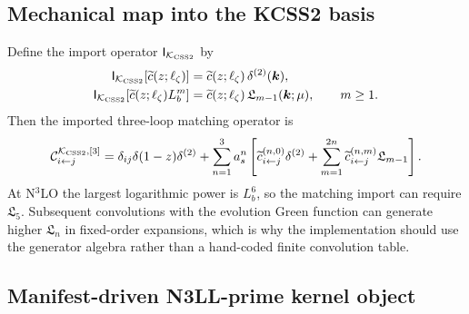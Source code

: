 \documentclass[11pt]{article}
\newcommand{\bk}{\bm{k}}
\newcommand{\deltaT}{\delta^{(2)}}
\newcommand{\KCSS}{\mathcal K_{\rm CSS2}}
\begin{document}
\subsection{Mechanical map into the KCSS2 basis}

Define the import operator \(\mathsf I_{\KCSS}\) by
\begin{align}
  \mathsf I_{\KCSS}\!
  \left[\widetilde c(z;\ell_\zeta)\right]
  & = \widetilde c(z;\ell_\zeta)\,\deltaT(\bk),
  \label{eq:IK-delta-v14}
  \\
  \mathsf I_{\KCSS}\!
  \left[\widetilde c(z;\ell_\zeta)L_b^m\right]
  & = \widetilde c(z;\ell_\zeta)\,\mathfrak L_{m-1}(\bk;\mu),
  \qquad m\ge1 .
  \label{eq:IK-frak-v14}
\end{align}
Then the imported three-loop matching operator is
\begin{equation}
  \mathcal C_{i\leftarrow j}^{\KCSS,[3]}
  =
  \delta_{ij}\delta(1-z)\deltaT
  +
  \sum_{n=1}^{3} a_s^n
  \left[
  \widetilde c_{i\leftarrow j}^{(n,0)}\deltaT
  +
  \sum_{m=1}^{2n}
  \widetilde c_{i\leftarrow j}^{(n,m)}\mathfrak L_{m-1}
  \right] .
  \label{eq:C-imported-v14}
\end{equation}
At N$^3$LO the largest logarithmic power is \(L_b^6\), so the matching import can require
\(\mathfrak L_5\).  Subsequent convolutions with the evolution Green function can generate
higher \(\mathfrak L_n\) in fixed-order expansions, which is why the implementation should
use the generator algebra rather than a hand-coded finite convolution table.

\subsection{Manifest-driven N3LL-prime kernel object}
\end{document}
